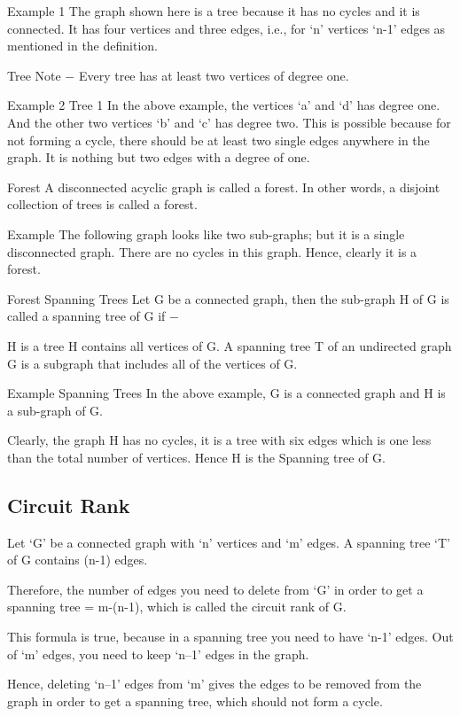 

Example 1
The graph shown here is a tree because it has no cycles and it is connected. It has four vertices and three edges, i.e., for ‘n’ vertices ‘n-1’ edges as mentioned in the definition.

Tree
Note − Every tree has at least two vertices of degree one.

Example 2
Tree 1
In the above example, the vertices ‘a’ and ‘d’ has degree one. And the other two vertices ‘b’ and ‘c’ has degree two. This is possible because for not forming a cycle, there should be at least two single edges anywhere in the graph. It is nothing but two edges with a degree of one.

Forest
A disconnected acyclic graph is called a forest. In other words, a disjoint collection of trees is called a forest.

Example
The following graph looks like two sub-graphs; but it is a single disconnected graph. There are no cycles in this graph. Hence, clearly it is a forest.

Forest
Spanning Trees
Let G be a connected graph, then the sub-graph H of G is called a spanning tree of G if −

H is a tree
H contains all vertices of G.
A spanning tree T of an undirected graph G is a subgraph that includes all of the vertices of G.

Example
Spanning Trees
In the above example, G is a connected graph and H is a sub-graph of G.

Clearly, the graph H has no cycles, it is a tree with six edges which is one less than the total number of vertices. Hence H is the Spanning tree of G.

\subsection{Circuit Rank}
Let ‘G’ be a connected graph with ‘n’ vertices and ‘m’ edges. A spanning tree ‘T’ of G contains (n-1) edges.

Therefore, the number of edges you need to delete from ‘G’ in order to get a spanning tree = m-(n-1), which is called the circuit rank of G.

This formula is true, because in a spanning tree you need to have ‘n-1’ edges. Out of ‘m’ edges, you need to keep ‘n–1’ edges in the graph.

Hence, deleting ‘n–1’ edges from ‘m’ gives the edges to be removed from the graph in order to get a spanning tree, which should not form a cycle.

